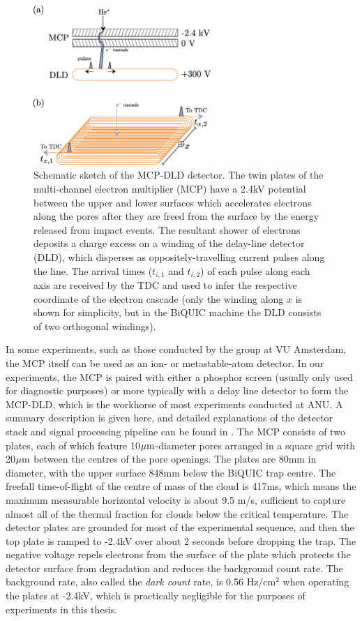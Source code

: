 	\begin{figure}
		\centering
		\includegraphics[width=0.6\textwidth]{fig/apparatus/mcp_dld_schematic}
		\caption{Schematic sketch of the MCP-DLD detector. The twin plates of the multi-channel electron multiplier (MCP) have a 2.4kV potential between the upper and lower surfaces which accelerates electrons along the pores after they are freed from the surface by the energy released from \mhe impact events. The resultant shower of electrons deposits a charge excess on a winding of the delay-line detector (DLD), which disperses as oppositely-travelling current pulses along the line. The arrival times ($t_{i,1}$ and $t_{i,2}$) of each pulse along each axis are received by the TDC and used to infer the respective coordinate of the electron cascade (only the winding along $x$ is shown for simplicity, but in the BiQUIC machine the DLD consists of two orthogonal windings).}
		\label{fig:MCP_DLD}
	\end{figure}

	In some experiments, such as those conducted by the \mhe group at VU Amsterdam, the MCP itself can be used as an ion- or metastable-atom detector.
	In our experiments, the MCP is paired with either a phosphor screen (usually only used for diagnostic purposes) or more typically with a delay line detector to form the MCP-DLD, which is the workhorse of most experiments conducted at ANU.
	A summary description is given here, and detailed explanations of the detector stack and signal processing pipeline can be found in \cite{ShinThesis, HodgmanThesis, ManningThesis}.
	The MCP consists of two plates, each of which feature 10$\mu\textrm{m}$-diameter pores arranged in a square grid with 20$\mu\textrm{m}$ between the centres of the pore openings.
	The plates are 80mm in diameter, with the upper surface 848mm below the BiQUIC trap centre.
	The freefall time-of-flight of the centre of mass of the cloud is 417ms, which means the maximum measurable horizontal velocity is about 9.5 m/s, sufficient to capture almost all of the thermal fraction for clouds below the critical temperature.
	The detector plates are grounded for most of the experimental sequence, and then the top plate is ramped to -2.4kV over about 2 seconds before dropping the trap.
	The negative voltage repels electrons from the surface of the plate which protects the detector surface from degradation and reduces the background count rate.
	The background rate, also called the \emph{dark count} rate, is 0.56 Hz/cm$^2$ when operating the plates at -2.4kV, which is practically negligible for the purposes of experiments in this thesis.
	

